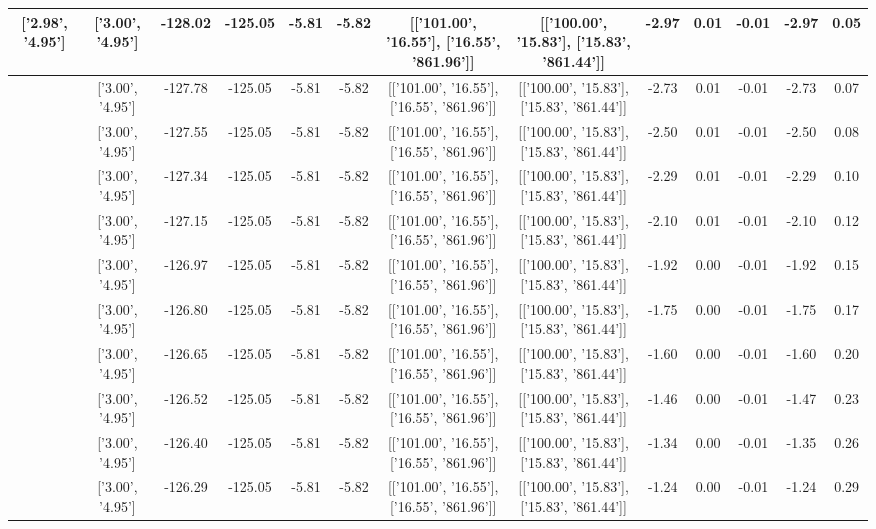 \begin{table}[htbp]
\begin{adjustbox}{angle=90}
\begin{tabular}{|c|c|c|c|c|c|c|c|c|c|c|c|c|}
 ['2.98', '4.95'] & ['3.00', '4.95'] & -128.02 & -125.05 & -5.81 & -5.82 & [['101.00', '16.55'], ['16.55', '861.96']] & [['100.00', '15.83'], ['15.83', '861.44']] & -2.97 & 0.01 & -0.01 & -2.97 & 0.05\\ \hline
 ['2.98', '4.95'] & ['3.00', '4.95'] & -127.78 & -125.05 & -5.81 & -5.82 & [['101.00', '16.55'], ['16.55', '861.96']] & [['100.00', '15.83'], ['15.83', '861.44']] & -2.73 & 0.01 & -0.01 & -2.73 & 0.07\\ \hline
 ['2.98', '4.95'] & ['3.00', '4.95'] & -127.55 & -125.05 & -5.81 & -5.82 & [['101.00', '16.55'], ['16.55', '861.96']] & [['100.00', '15.83'], ['15.83', '861.44']] & -2.50 & 0.01 & -0.01 & -2.50 & 0.08\\ \hline
 ['2.98', '4.95'] & ['3.00', '4.95'] & -127.34 & -125.05 & -5.81 & -5.82 & [['101.00', '16.55'], ['16.55', '861.96']] & [['100.00', '15.83'], ['15.83', '861.44']] & -2.29 & 0.01 & -0.01 & -2.29 & 0.10\\ \hline
 ['2.98', '4.95'] & ['3.00', '4.95'] & -127.15 & -125.05 & -5.81 & -5.82 & [['101.00', '16.55'], ['16.55', '861.96']] & [['100.00', '15.83'], ['15.83', '861.44']] & -2.10 & 0.01 & -0.01 & -2.10 & 0.12\\ \hline
 ['2.99', '4.95'] & ['3.00', '4.95'] & -126.97 & -125.05 & -5.81 & -5.82 & [['101.00', '16.55'], ['16.55', '861.96']] & [['100.00', '15.83'], ['15.83', '861.44']] & -1.92 & 0.00 & -0.01 & -1.92 & 0.15\\ \hline
 ['2.99', '4.95'] & ['3.00', '4.95'] & -126.80 & -125.05 & -5.81 & -5.82 & [['101.00', '16.55'], ['16.55', '861.96']] & [['100.00', '15.83'], ['15.83', '861.44']] & -1.75 & 0.00 & -0.01 & -1.75 & 0.17\\ \hline
 ['2.99', '4.95'] & ['3.00', '4.95'] & -126.65 & -125.05 & -5.81 & -5.82 & [['101.00', '16.55'], ['16.55', '861.96']] & [['100.00', '15.83'], ['15.83', '861.44']] & -1.60 & 0.00 & -0.01 & -1.60 & 0.20\\ \hline
 ['2.99', '4.95'] & ['3.00', '4.95'] & -126.52 & -125.05 & -5.81 & -5.82 & [['101.00', '16.55'], ['16.55', '861.96']] & [['100.00', '15.83'], ['15.83', '861.44']] & -1.46 & 0.00 & -0.01 & -1.47 & 0.23\\ \hline
 ['2.99', '4.95'] & ['3.00', '4.95'] & -126.40 & -125.05 & -5.81 & -5.82 & [['101.00', '16.55'], ['16.55', '861.96']] & [['100.00', '15.83'], ['15.83', '861.44']] & -1.34 & 0.00 & -0.01 & -1.35 & 0.26\\ \hline
 ['2.99', '4.95'] & ['3.00', '4.95'] & -126.29 & -125.05 & -5.81 & -5.82 & [['101.00', '16.55'], ['16.55', '861.96']] & [['100.00', '15.83'], ['15.83', '861.44']] & -1.24 & 0.00 & -0.01 & -1.24 & 0.29\\ \hline

\end{tabular}
\end{adjustbox}
\end{table}
